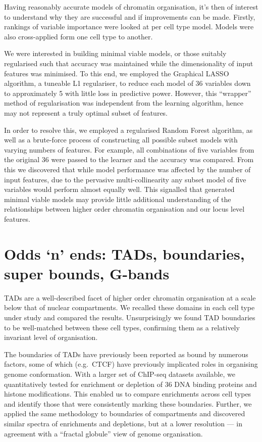 \documentclass[a4paper,10pt,oneside]{book}
\begin{document}
Having reasonably accurate models of chromatin organisation, it's then
of interest to understand why they are successful and if improvements
can be made. Firstly, rankings of variable importance were looked at per
cell type model. Models were also cross-applied form one cell type to
another.

We were interested in building minimal viable models, or those suitably
regularised such that accuracy was maintained while the dimensionality
of input features was minimised. To this end, we employed the Graphical
LASSO algorithm, a tuneable L1 regulariser, to reduce each model of 36
variables down to approximately 5 with little loss in predictive power.
However, this ``wrapper'' method of regularisation was independent from
the learning algorithm, hence may not represent a truly optimal subset
of features.

In order to resolve this, we employed a regularised Random Forest
algorithm\cite{deng2012, Touw2013a}, as well as a brute-force process of
constructing all possible subset models with varying numbers of
features. For example, all combinations of five variables from the
original 36 were passed to the learner and the accuracy was compared.
From this we discovered that while model performance was affected by the
number of input features, due to the pervasive multi-collinearity any
subset model of five variables would perform almost equally well. This
signalled that generated minimal viable models may provide little
additional understanding of the relationships between higher order
chromatin organisation and our locus level features.

\section{\textbf{Odds `n' ends}: TADs, boundaries, super bounds,
G-bands}\label{odds-n-ends-tads-boundaries-super-bounds-g-bands}

TADs are a well-described facet of higher order chromatin organisation
at a scale below that of nuclear compartments. We recalled these domains
in each cell type under study and compared the results. Unsurprisingly
we found TAD boundaries to be well-matched between these cell types,
confirming them as a relatively invariant level of organisation.

The boundaries of TADs have previously been reported as bound by
numerous factors, some of which (e.g.~CTCF\citep{Ong2014}) have
previously implicated roles in organising genome conformation. With a
larger set of ChIP-seq datasets available, we quantitatively tested for
enrichment or depletion of 36 DNA binding proteins and histone
modifications. This enabled us to compare enrichments across cell types
and identify those that were consistently marking these boundaries.
Further, we applied the same methodology to boundaries of compartments
and discovered similar spectra of enrichments and depletions, but at a
lower resolution --- in agreement with a ``fractal globule'' view of
genome organisation.
\end{document}
